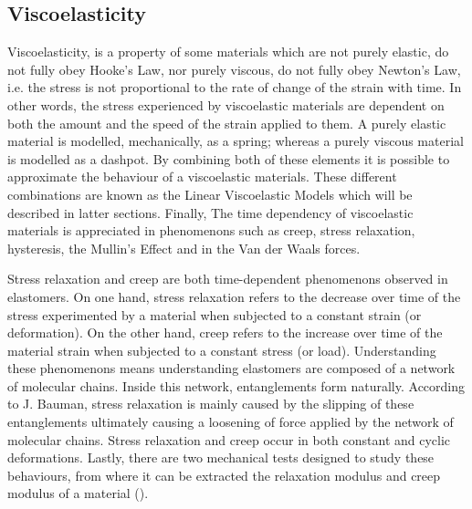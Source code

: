 \subsection{Viscoelasticity}
Viscoelasticity, is a property of some materials which are not purely elastic, do not fully obey Hooke's Law, nor purely viscous, do not fully obey Newton's Law, i.e. the stress is not proportional to the rate of change of the strain with time. In other words, the stress experienced by viscoelastic materials are dependent on both the amount and the speed of the strain applied to them. A purely elastic material is modelled, mechanically, as a spring; whereas a purely viscous material is modelled as a dashpot. By combining both of these elements it is possible to approximate the behaviour of a viscoelastic materials. These different combinations are known as the Linear Viscoelastic Models which will be described in latter sections. Finally, The time dependency of viscoelastic materials is appreciated in phenomenons such as creep, stress relaxation, hysteresis, the Mullin's Effect and in the Van der Waals forces.

Stress relaxation and creep are both time-dependent phenomenons observed in elastomers. On one hand, stress relaxation refers to the decrease over time of the stress experimented by a material when subjected to a constant strain (or deformation). On the other hand, creep refers to the increase over time of the material strain when subjected to a constant stress (or load). Understanding these phenomenons means understanding elastomers are composed of a network of molecular chains. Inside this network, entanglements form naturally. According to J. Bauman, stress relaxation is mainly caused by the slipping of these entanglements ultimately causing a loosening of force applied by the network of molecular chains. Stress relaxation and creep occur in both constant and cyclic deformations. Lastly, there are two mechanical tests designed to study these behaviours, from where it can be extracted the relaxation modulus and creep modulus of a material (\cite{oberg2016}). 

